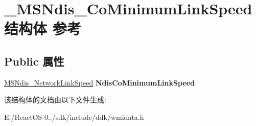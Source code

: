 \hypertarget{struct___m_s_ndis___co_minimum_link_speed}{}\section{\+\_\+\+M\+S\+Ndis\+\_\+\+Co\+Minimum\+Link\+Speed结构体 参考}
\label{struct___m_s_ndis___co_minimum_link_speed}
\subsection*{Public 属性}
\begin{DoxyCompactItemize}
\item 
\mbox{\label{struct___m_s_ndis___co_minimum_link_speed_af5df9e6c3c63584decf0c77d3fc5798d}} 
\hyperlink{struct___m_s_ndis___network_link_speed}{M\+S\+Ndis\+\_\+\+Network\+Link\+Speed} {\bfseries Ndis\+Co\+Minimum\+Link\+Speed}
\end{DoxyCompactItemize}


该结构体的文档由以下文件生成\+:\begin{DoxyCompactItemize}
\item 
E\+:/\+React\+O\+S-\/0../sdk/include/ddk/wmidata.\+h\end{DoxyCompactItemize}
